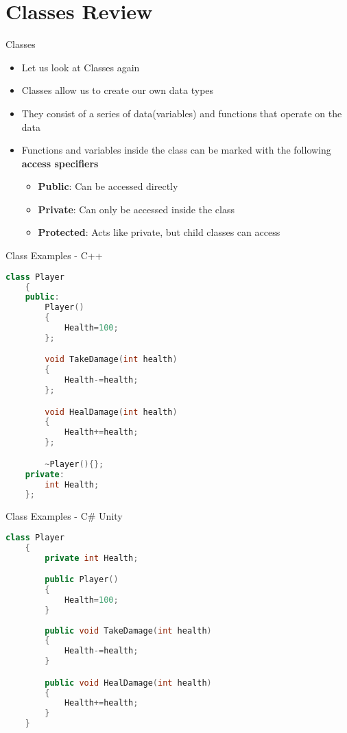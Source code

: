 \part{Classes Review}
\frame{\partpage}

\begin{frame}{Classes}
	\begin{itemize}
		\pause \item Let us look at Classes again
		\pause \item Classes allow us to create our own data types
		\pause \item They consist of a series of data(variables) and functions that operate on the data
		\pause \item Functions and variables inside the class can be marked with the following \textbf{access specifiers}
		\begin{itemize}
			\pause \item \textbf{Public}: Can be accessed directly
			\pause \item \textbf{Private}: Can only be accessed inside the class
			\pause \item \textbf{Protected}: Acts like private, but child classes can access
		\end{itemize}
	\end{itemize}
\end{frame}

\begin{frame}[fragile]{Class Examples - C++}
	\begin{lstlisting}[language=C++,basicstyle=\tiny,]
	class Player
	{
	public:
		Player()
		{
			Health=100;
		};

		void TakeDamage(int health)
		{
			Health-=health;
		};

		void HealDamage(int health)
		{
			Health+=health;
		};

		~Player(){};
	private:
		int Health;
	};
\end{lstlisting}
\end{frame}

\begin{frame}[fragile]{Class Examples - C\# Unity}
\begin{lstlisting}[language=C++,basicstyle=\tiny,]
	class Player
	{
		private int Health;

		public Player()
		{
			Health=100;
		}
		
		public void TakeDamage(int health)
		{
			Health-=health;
		}

		public void HealDamage(int health)
		{
			Health+=health;
		}
	}
\end{lstlisting}
\end{frame}


